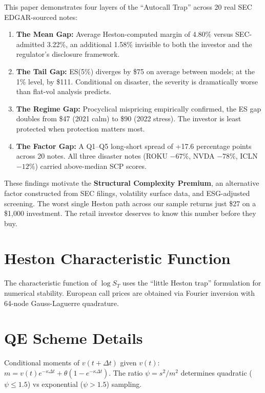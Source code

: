 \documentclass[12pt,a4paper]{article}
\begin{document}
This paper demonstrates four layers of the ``Autocall Trap'' across 20 real SEC EDGAR-sourced notes:
\begin{enumerate}[leftmargin=2cm]
    \item \textbf{The Mean Gap:} Average Heston-computed margin of 4.80\% versus SEC-admitted 3.22\%, an additional 1.58\% invisible to both the investor and the regulator's disclosure framework.
    \item \textbf{The Tail Gap:} ES(5\%) diverges by \$75 on average between models; at the 1\% level, by \$111. Conditional on disaster, the severity is dramatically worse than flat-vol analysis predicts.
    \item \textbf{The Regime Gap:} Procyclical mispricing empirically confirmed, the ES gap doubles from \$47 (2021 calm) to \$90 (2022 stress). The investor is least protected when protection matters most.
    \item \textbf{The Factor Gap:} A Q1--Q5 long-short spread of +17.6 percentage points across 20 notes. All three disaster notes (ROKU $-67\%$, NVDA $-78\%$, ICLN $-12\%$) carried above-median SCP scores.
\end{enumerate}

These findings motivate the \textbf{Structural Complexity Premium}, an alternative factor constructed from SEC filings, volatility surface data, and ESG-adjusted screening. The worst single Heston path across our sample returns just \$27 on a \$1,000 investment. The retail investor deserves to know this number before they buy.

\newpage
\appendix

\section{Heston Characteristic Function}
The characteristic function of $\log S_T$ uses the ``little Heston trap'' formulation \citep{albrecher2007} for numerical stability. European call prices are obtained via Fourier inversion with 64-node Gauss-Laguerre quadrature.

\section{QE Scheme Details}
Conditional moments of $v(t+\Delta t)$ given $v(t)$: $m = v(t)e^{-\kappa\Delta t} + \theta(1-e^{-\kappa\Delta t})$. The ratio $\psi = s^2/m^2$ determines quadratic ($\psi \leq 1.5$) vs exponential ($\psi > 1.5$) sampling.
\end{document}
